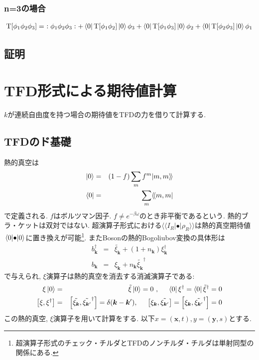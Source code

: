 \documentclass[10.5pt,a4paper]{jreport}
\newcommand{\dket}[1]{| #1 \rangle \! \rangle}
\newcommand{\dbra}[1]{\langle \! \langle #1 |}
\begin{document}
\subsubsection{n=3の場合}
\begin{eqnarray}
  {\rm T}[\phi_1\phi_2\phi_3] =\ :\phi_1\phi_2\phi_3: + \bra{0}{\rm T}[\phi_1\phi_2]\ket{0}\phi_3 + \bra{0}{\rm T}[\phi_1\phi_3]\ket{0}\phi_2 + \bra{0}{\rm T}[\phi_2\phi_3]\ket{0}\phi_1 
\end{eqnarray}
\subsection{証明}
\section{TFD形式による期待値計算}
$k$が連続自由度を持つ場合の期待値をTFDの力を借りて計算する.
\subsection{TFDのド基礎}
熱的真空は
\begin{eqnarray}
  \ket{0} &=& (1-f)\sum_mf^m\dket{m, m}\\
  \bra{0} &=& \sum_m\dbra{m, m}
\end{eqnarray}
で定義される. $f$はボルツマン因子. $f \neq e^{-\beta\omega}$のとき非平衡であるという. 熱的ブラ・ケットは双対ではない.
超演算子形式における$\dbra{I_R}\bullet\dket{\rho_R}$は熱的真空期待値$\ev{\bullet}{0}$に置き換えが可能\footnote{超演算子形式のチェック・チルダとTFDのノンチルダ・チルダは単射同型の関係にある. }. またBosonの熱的Bogoliubov変換の具体形は
\begin{eqnarray}
  b_{\bm{k}}^\dagger &=& \tilde{\xi_{\bm{k}}} + (1+n_{\bm{k}})\xi_{\bm{k}}^\dagger\\
  b_{\bm{k}} &=& \xi_{\bm{k}} + n_{\bm{k}}\tilde{\xi_{\bm{k}}}^\dagger
\end{eqnarray}
で与えられ, $\xi$演算子は熱的真空を消去する消滅演算子である:
\begin{eqnarray}
  \xi\ket{0} &=& \tilde{\xi}\ket{0} = 0\ ,\hspace{0.5cm} \bra{0}\xi^\dagger = \bra{0}\tilde{\xi}^\dagger = 0\\
  \comm{\xi}{\xi^\dagger} &=& \comm{\tilde{\xi_{\bm{k}}}}{\tilde{\xi_{\bm{k}'}}^\dagger} = \delta(\bm{k}-\bm{k}'), \hspace{0.5cm} \comm{\xi_{\bm{k}}}{\tilde{\xi_{\bm{k}'}}} = \comm{\xi_{\bm{k}}}{\tilde{\xi_{\bm{k}'}}^\dagger} = 0
\end{eqnarray}
この熱的真空, $\xi$演算子を用いて計算をする. 以下$x = (\bm{x}, t), y = (\bm{y}, s)$とする. 
\end{document}
